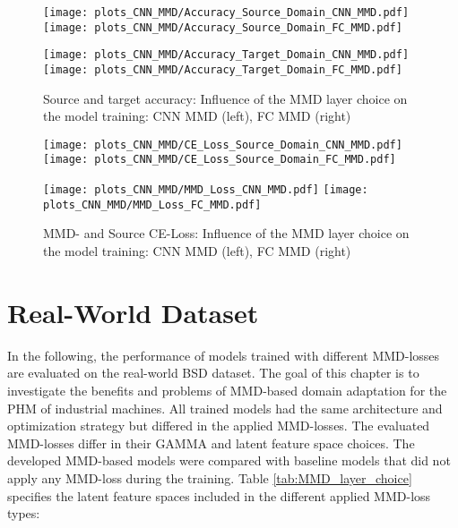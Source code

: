 \begin{figure}[htp]
  \centering
  \texttt{[image: plots\_CNN\_MMD/Accuracy\_Source\_Domain\_CNN\_MMD.pdf]}
  \hspace{.3cm}
  \texttt{[image: plots\_CNN\_MMD/Accuracy\_Source\_Domain\_FC\_MMD.pdf]}

  \vspace{.1cm}

  \texttt{[image: plots\_CNN\_MMD/Accuracy\_Target\_Domain\_CNN\_MMD.pdf]}
  \hspace{.3cm}
  \texttt{[image: plots\_CNN\_MMD/Accuracy\_Target\_Domain\_FC\_MMD.pdf]}

  \caption{Source and target accuracy: Influence of the MMD layer choice on the model training: CNN MMD (left), FC MMD (right)}
  \label{fig:accuracy_cnn_and_no_cnn_mmd}
\end{figure}

\begin{figure}[H]
  \centering
  \texttt{[image: plots\_CNN\_MMD/CE\_Loss\_Source\_Domain\_CNN\_MMD.pdf]}
  \hspace{.3cm}
  \texttt{[image: plots\_CNN\_MMD/CE\_Loss\_Source\_Domain\_FC\_MMD.pdf]}

  \vspace{.1cm}

  \texttt{[image: plots\_CNN\_MMD/MMD\_Loss\_CNN\_MMD.pdf]}
  \hspace{.1cm}
  \texttt{[image: plots\_CNN\_MMD/MMD\_Loss\_FC\_MMD.pdf]}

  \caption{MMD- and Source CE-Loss: Influence of the MMD layer choice on the model training: CNN MMD (left), FC MMD (right)}
  \label{fig:loss_cnn_and_no_cnn_mmd}
\end{figure}

\section{Real-World Dataset}\label{sec:results_real_world_dataset}
In the following, the performance of models trained with different MMD-losses are evaluated on the real-world BSD dataset. The goal of this chapter is to investigate the benefits and problems of MMD-based domain adaptation for the PHM of industrial machines. All trained models had the same architecture and optimization strategy but differed in the applied MMD-losses. The evaluated MMD-losses differ in their GAMMA and latent feature space choices. The developed MMD-based models were compared with baseline models that did not apply any MMD-loss during the training. Table \ref{tab:MMD_layer_choice}  specifies the latent feature spaces included in the different applied MMD-loss types:

